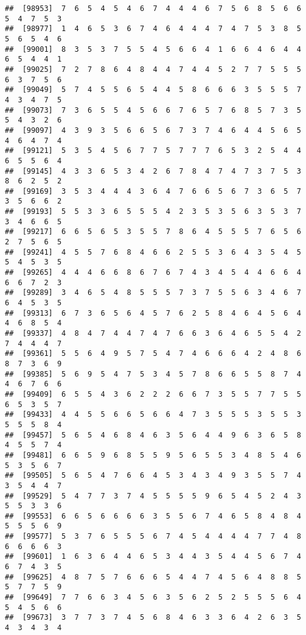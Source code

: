 \documentclass[
]{book}
\begin{document}
\begin{verbatim}
##  [98953]  7  6  5  4  5  4  6  7  4  4  4  6  7  5  6  8  5  6  6  5  4  7  5  3
##  [98977]  1  4  6  5  3  6  7  4  6  4  4  4  7  4  7  5  3  8  5  5  6  5  4  6
##  [99001]  8  3  5  3  7  5  5  4  5  6  6  4  1  6  6  4  6  4  4  6  5  4  4  1
##  [99025]  7  2  7  8  6  4  8  4  4  7  4  4  5  2  7  7  5  5  5  6  3  7  5  6
##  [99049]  5  7  4  5  5  6  5  4  4  5  8  6  6  6  3  5  5  5  7  4  3  4  7  5
##  [99073]  7  3  6  5  5  4  5  6  6  7  6  5  7  6  8  5  7  3  5  5  4  3  2  6
##  [99097]  4  3  9  3  5  6  6  5  6  7  3  7  4  6  4  4  5  6  5  4  6  4  7  4
##  [99121]  5  3  5  4  5  6  7  7  5  7  7  7  6  5  3  2  5  4  4  6  5  5  6  4
##  [99145]  4  3  3  6  5  3  4  2  6  7  8  4  7  4  7  3  7  5  3  8  6  2  5  2
##  [99169]  3  5  3  4  4  4  3  6  4  7  6  6  5  6  7  3  6  5  7  3  5  6  6  2
##  [99193]  5  5  3  3  6  5  5  5  4  2  3  5  3  5  6  3  5  3  7  3  4  6  6  5
##  [99217]  6  6  5  6  5  3  5  5  7  8  6  4  5  5  5  7  6  5  6  2  7  5  6  5
##  [99241]  4  5  5  7  6  8  4  6  6  2  5  5  3  6  4  3  5  4  5  5  4  5  3  5
##  [99265]  4  4  4  6  6  8  6  7  6  7  4  3  4  5  4  4  6  6  4  6  6  7  2  3
##  [99289]  3  4  6  5  4  8  5  5  5  7  3  7  5  5  6  3  4  6  7  6  4  5  3  5
##  [99313]  6  7  3  6  5  6  4  5  7  6  2  5  8  4  6  4  5  6  4  4  6  8  5  4
##  [99337]  4  8  4  7  4  4  7  4  7  6  6  3  6  4  6  5  5  4  2  7  4  4  4  7
##  [99361]  5  5  6  4  9  5  7  5  4  7  4  6  6  6  4  2  4  8  6  8  7  3  6  9
##  [99385]  5  6  9  5  4  7  5  3  4  5  7  8  6  6  5  5  8  7  4  4  6  7  6  6
##  [99409]  6  5  5  4  3  6  2  2  2  6  6  7  3  5  5  7  7  5  5  6  5  3  5  7
##  [99433]  4  4  5  5  6  6  5  6  6  4  7  3  5  5  5  3  5  5  3  5  5  5  8  4
##  [99457]  5  6  5  4  6  8  4  6  3  5  6  4  4  9  6  3  6  5  8  4  5  5  7  4
##  [99481]  6  6  5  9  6  8  5  5  9  5  6  5  5  3  4  8  5  4  6  5  3  5  6  7
##  [99505]  5  6  5  4  7  6  6  4  5  3  4  3  4  9  3  5  5  7  4  3  5  4  4  7
##  [99529]  5  4  7  7  3  7  4  5  5  5  5  9  6  5  4  5  2  4  3  5  5  3  3  6
##  [99553]  6  6  5  6  6  6  6  3  5  5  6  7  4  6  5  8  4  8  4  5  5  5  6  9
##  [99577]  5  3  7  6  5  5  5  6  7  4  5  4  4  4  4  7  7  4  8  6  6  6  6  3
##  [99601]  1  6  3  6  4  4  6  5  3  4  4  3  5  4  4  5  6  7  4  6  7  4  3  5
##  [99625]  4  8  7  5  7  6  6  6  5  4  4  7  4  5  6  4  8  8  5  5  7  7  5  9
##  [99649]  7  7  6  6  3  4  5  6  3  5  6  2  5  2  5  5  5  6  4  5  4  5  6  6
##  [99673]  3  7  7  3  7  4  5  6  8  4  6  3  3  6  4  2  6  3  5  4  3  4  3  4

\end{verbatim}
\end{document}
